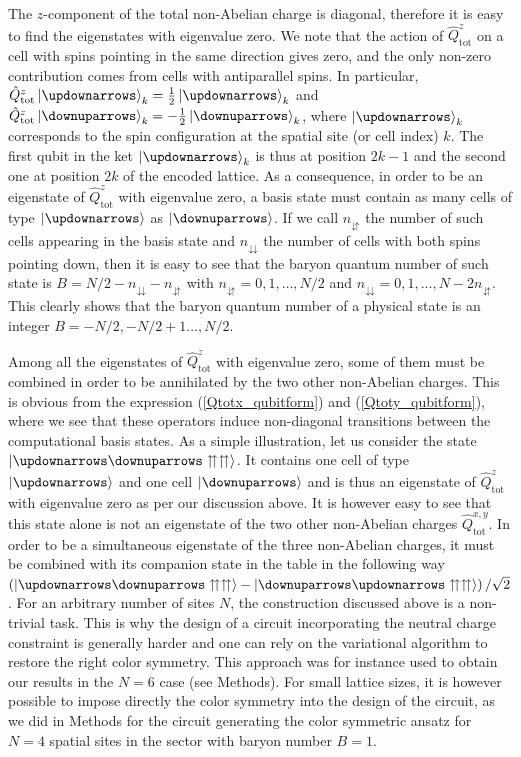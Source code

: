 \documentclass[twocolumn,aps,showpacs,prb,superscriptaddress,floatfix,10pt,nofootinbib]{revtex4-2}
\begin{document}
The $z$-component of the total non-Abelian charge is diagonal, therefore it is easy to find the eigenstates with eigenvalue zero. We note that the action of $\hat{Q}_{\mathrm{tot}}^{z}$ on a cell with spins pointing in the same direction gives zero, and the only non-zero contribution comes from cells with antiparallel spins. In particular, $\hat{Q}_{\mathrm{tot}}^{z}\ket{\updownarrows}_{k}=\frac{1}{2}\ket{\updownarrows}_{k}$ and $\hat{Q}_{\mathrm{tot}}^{z}\ket{\downuparrows}_{k}=-\frac{1}{2}\ket{\downuparrows}_{k}$, where $\ket{\updownarrows}_{k}$ corresponds to the spin configuration at the spatial site (or cell index)  $k$. The first qubit in the ket $\ket{\updownarrows}_{k}$ is thus at position $2k-1$ and the second one at position $2k$ of the encoded lattice. As a consequence, in order to be an eigenstate of $\hat{Q}_{\mathrm{tot}}^{z}$ with eigenvalue zero, a basis state must contain as many cells of type $\ket{\updownarrows}$ as $\ket{ \downuparrows}$. If we call $n_{\downuparrows}$ the number of such cells appearing in the basis state and $n_{\downdownarrows}$ the number of cells with both spins pointing down, then it is easy to see that the baryon quantum number of such state is $B=N/2-n_{\downdownarrows}-n_{\downuparrows}$ with $n_{\downuparrows}=0,1,\dots,N/2$ and $n_{\downdownarrows}=0,1,\dots, N-2n_{\downuparrows}$. This clearly shows that the baryon quantum number of a physical state is an integer $B=-N/2,-N/2+1\dots,N/2$. 

Among all the eigenstates of $\hat{Q}_{\mathrm{tot}}^{z}$ with eigenvalue zero, some of them must be combined in order to be annihilated by the two other non-Abelian charges. This is obvious from the expression (\ref{Qtotx_qubitform}) and (\ref{Qtoty_qubitform}), where we see that these operators induce non-diagonal transitions between the computational basis states. As a simple illustration, let us consider the state $\ket{\updownarrows \downuparrows \upuparrows \upuparrows}$. It contains one cell of type $\ket{\updownarrows}$ and one cell $\ket{\downuparrows}$ and is thus an eigenstate of $\hat{Q}_{\mathrm{tot}}^{z}$ with eigenvalue zero as per our discussion above. It is however easy to see that this state alone is not an eigenstate of the two other non-Abelian charges $\hat{Q}_{\mathrm{tot}}^{x,y}$. In order to be a simultaneous eigenstate of the three non-Abelian charges, it must be combined with its companion state in the table in the following way $\left(\ket{\updownarrows \downuparrows \upuparrows \upuparrows} -\ket{\downuparrows \updownarrows \upuparrows \upuparrows}\right)/\sqrt{2}$. 
For an arbitrary number of sites $N$, the construction discussed above is a non-trivial task. This is why the design of a circuit incorporating the neutral charge constraint is generally harder and one can rely on the variational algorithm to restore the right color symmetry. This approach was for instance used to obtain our results in the $N=6$ case (see Methods). For small lattice sizes, it is however possible to impose directly the color symmetry into the design of the circuit, as we did in Methods for the circuit generating the color symmetric ansatz for $N=4$ spatial sites in the sector with baryon number $B=1$. 
\end{document}
